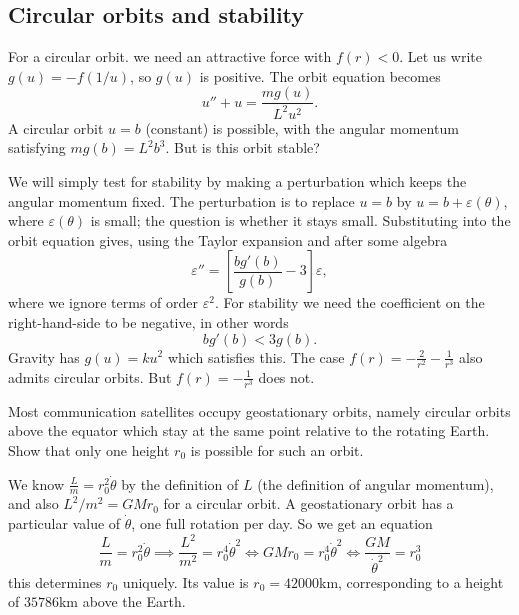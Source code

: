 \documentclass[10pt, a4paper]{article}
\begin{document}
\subsection{Circular orbits and stability}

For a circular orbit.
we need an attractive force with $f(r) < 0$.
Let us write $g(u) = -f(1 / u)$,
so $g(u)$ is positive.
The orbit equation becomes
\[
u'' + u = \frac{mg(u)}{L ^ 2u ^ 2}.
\]
A circular orbit $u = b$
(constant)
is possible,
with the angular momentum satisfying $mg(b) = L ^ 2b ^ 3$.
But is this orbit stable?

We will simply test for stability by making a perturbation which keeps the angular momentum fixed.
The perturbation is to replace $u = b$ by $u = b + \varepsilon(\theta)$,
where $\varepsilon(\theta)$ is small;
the question is whether it stays small.
Substituting into the orbit equation gives,
using the Taylor expansion and after some algebra
\[
\varepsilon'' = \left[\frac{bg'(b)}{g(b)} - 3\right]\varepsilon,
\]
where we ignore terms of order $\varepsilon ^ 2$.
For stability we need the coefficient on the right-hand-side to be negative,
in other words
\[
bg'(b) < 3g(b).
\]
Gravity has $g(u) = ku ^ 2$ which satisfies this.
The case $f(r) = -\frac{2}{r ^ 2} - \frac{1}{r ^ 3}$ also admits circular orbits.
But $f(r) = -\frac{1}{r ^ 3}$ does not.

\begin{example}
    Most communication satellites occupy geostationary orbits,
    namely circular orbits above the equator which stay at the same point relative to the rotating Earth.
    Show that only one height $r_0$ is possible for such an orbit.

    \begin{solution}
        We know $\frac{L}{m} = r_0 ^ 2\dot{\theta}$ by the definition of $L$
        (the definition of angular momentum),
        and also $L ^ 2 / m ^ 2 = GMr_0$ for a circular orbit.
        A geostationary orbit has a particular value of $\dot{\theta}$,
        one full rotation per day.
        So we get an equation
        \[
        \frac{L}{m} = r_0 ^ 2\dot{\theta} \implies \frac{L ^ 2}{m ^ 2} = r_0 ^ 4\dot{\theta} ^ 2  \iff GMr_0 = r_0 ^ 4\dot{\theta} ^ 2 \iff \frac{GM}{\dot{\theta} ^ 2} = r_0 ^ 3
        \]
        this determines $r_0$ uniquely.
        Its value is $r_0 = 42000$km,
        corresponding to a height of $35786$km above the Earth.
    \end{solution}
\end{example}
\end{document}
